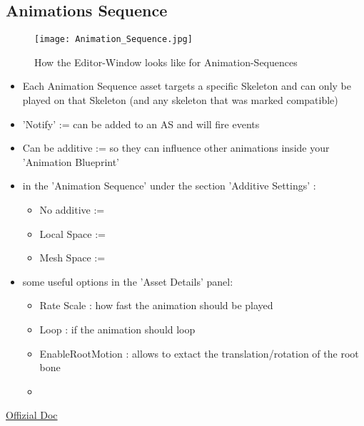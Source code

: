         \subsection{Animations Sequence}
            \begin{figure}
                \texttt{[image: Animation\_Sequence.jpg]}
                \caption{How the Editor-Window looks like for Animation-Sequences}
            \end{figure}
            \begin{itemize}
                \item Each Animation Sequence asset targets a specific Skeleton and can only be played on that Skeleton (and any skeleton that was marked compatible)
                \item 'Notify' := can be added to an AS and will fire events
                \item Can be additive := so they can influence other animations inside your 'Animation Blueprint'
                \item in the 'Animation Sequence' under the section 'Additive Settings' :
                \begin{itemize}
                    \item No additive := 
                    \item Local Space := 
                    \item Mesh Space := 
                \end{itemize}
                \item some useful options in the 'Asset Details' panel:
                \begin{itemize}
                    \item Rate Scale : how fast the animation should be played
                    \item Loop : if the animation should loop
                    \item EnableRootMotion : allows to extact the translation/rotation of the root bone
                    \item 
                \end{itemize}
            \end{itemize}
            \href{https://docs.unrealengine.com/4.27/en-US/AnimatingObjects/SkeletalMeshAnimation/Sequences/}{Offizial Doc}

